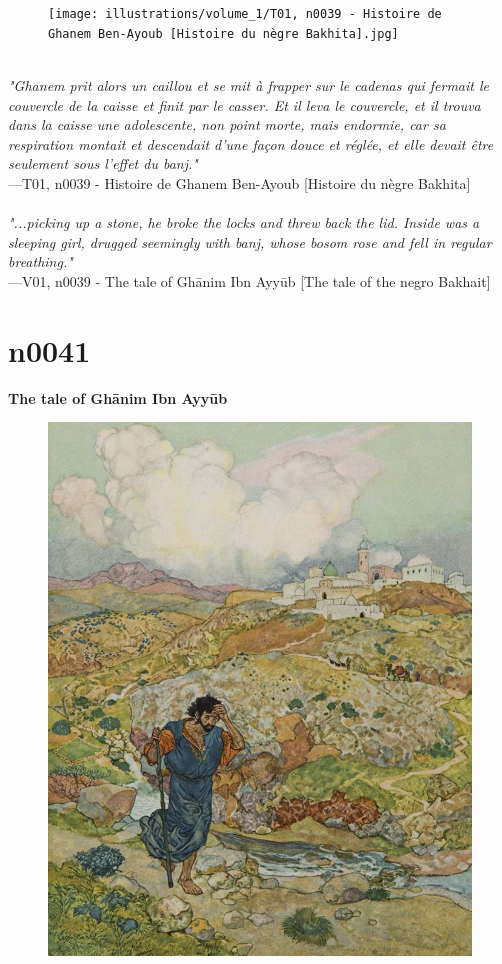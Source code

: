 \documentclass[../Carre_nights.tex]{subfiles}
\begin{document}
\begin{figure}[ht]
\centering
\texttt{[image: illustrations/volume\_1/T01, n0039 - Histoire de Ghanem Ben-Ayoub [Histoire du nègre Bakhita].jpg]}
\end{figure}

\textit{\\
"Ghanem prit alors un caillou et se mit à frapper sur le cadenas qui fermait le couvercle de la caisse et finit par le casser. Et il leva le couvercle, et il trouva dans la caisse une adolescente, non point morte, mais endormie, car sa respiration montait et descendait d’une façon douce et réglée, et elle devait être seulement sous l’effet du banj."} \\
—T01, n0039 - Histoire de Ghanem Ben-Ayoub [Histoire du nègre Bakhita] \\~\\
\textit{"...picking up a stone, he broke the locks and threw back the lid. Inside was a sleeping girl, drugged seemingly with banj, whose bosom rose and fell in regular breathing."} \\
—V01, n0039 - The tale of Gh\=anim Ibn Ayy\=ub [The tale of the negro Bakhait]

\newpage

\section{n0041}
\textbf{\Large{The tale of Gh\=anim Ibn Ayy\=ub}} \\

\begin{figure}[ht]
\centering
\includegraphics[height=\figsize]{illustrations/volume_1/T01, n0041 - Histoire de Ghanem Ben-Ayoub.jpg}
\end{figure}
\end{document}
